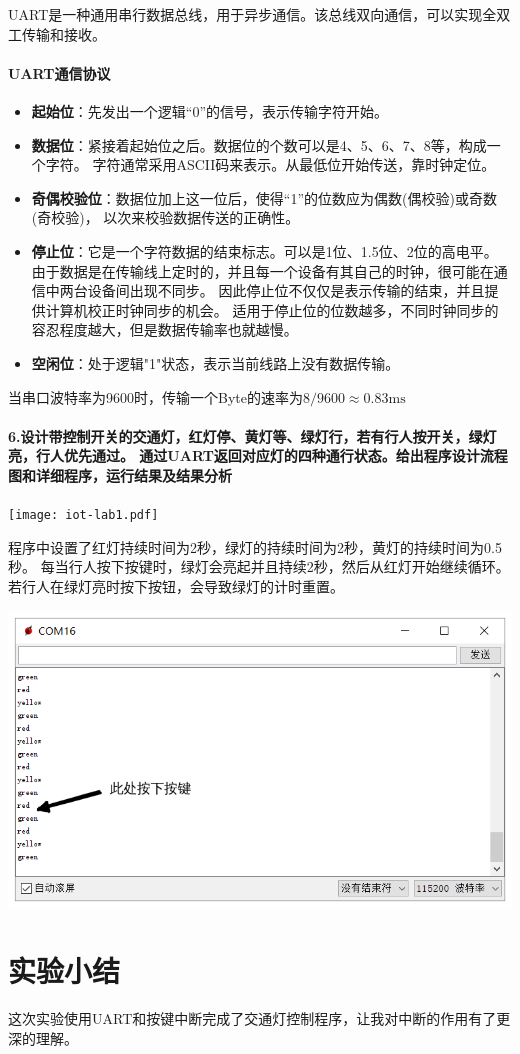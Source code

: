 \documentclass[a4paper]{ctexart}
\begin{document}
  UART是一种通用串行数据总线，用于异步通信。该总线双向通信，可以实现全双工传输和接收。
  \paragraph*{UART通信协议}
  \begin{itemize}
    \item \textbf{起始位}：先发出一个逻辑“0”的信号，表示传输字符开始。
    \item \textbf{数据位}：紧接着起始位之后。数据位的个数可以是4、5、6、7、8等，构成一个字符。
    字符通常采用ASCII码来表示。从最低位开始传送，靠时钟定位。
    \item \textbf{奇偶校验位}：数据位加上这一位后，使得“1”的位数应为偶数(偶校验)或奇数(奇校验)，
    以次来校验数据传送的正确性。
    \item \textbf{停止位}：它是一个字符数据的结束标志。可以是1位、1.5位、2位的高电平。
    由于数据是在传输线上定时的，并且每一个设备有其自己的时钟，很可能在通信中两台设备间出现不同步。
    因此停止位不仅仅是表示传输的结束，并且提供计算机校正时钟同步的机会。
    适用于停止位的位数越多，不同时钟同步的容忍程度越大，但是数据传输率也就越慢。
    \item \textbf{空闲位}：处于逻辑"1"状态，表示当前线路上没有数据传输。
  \end{itemize}

  当串口波特率为9600时，传输一个Byte的速率为$8/9600\approx 0.83\mathrm{ms}$

  \paragraph{6.设计带控制开关的交通灯，红灯停、黄灯等、绿灯行，若有行人按开关，绿灯亮，行人优先通过。
  通过UART返回对应灯的四种通行状态。给出程序设计流程图和详细程序，运行结果及结果分析\\}
  \texttt{[image: iot-lab1.pdf]}
  
  程序中设置了红灯持续时间为2秒，绿灯的持续时间为2秒，黄灯的持续时间为0.5秒。
  每当行人按下按键时，绿灯会亮起并且持续2秒，然后从红灯开始继续循环。
  若行人在绿灯亮时按下按钮，会导致绿灯的计时重置。

  \includegraphics*[width=1.0\textwidth]{uart.png}

  \section{实验小结}
  这次实验使用UART和按键中断完成了交通灯控制程序，让我对中断的作用有了更深的理解。
\end{document}
